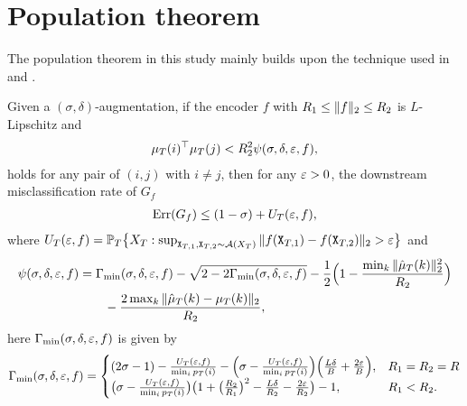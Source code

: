 \section{Population theorem}\label{section: Appendix A}
The population theorem in this study mainly builds upon the technique used in \citet{huang2023towards} and \citet{duan2024unsupervisedtransferlearningadversarial}.
\begin{lemma}
\label{lemma: sufficient condition of small Err}
Given a $(\sigma, \delta)$-augmentation, if the encoder $f$ with $R_1 \leq \Vert{f}\Vert_2 \leq R_2$ is $L$-Lipschitz and
\begin{align*}
\mu_T(i)^\top\mu_T(j) < R_2^2\psi(\sigma, \delta, \varepsilon, f),
\end{align*}
holds for any pair of $(i,j)$ with $i \neq j$, then for any $\varepsilon > 0$, the downstream misclassification rate of $G_f$
\begin{align*}
\text{\rm Err}(G_f) \leq (1 - \sigma) + U_T(\varepsilon, f),
\end{align*}
where $U_T(\varepsilon, f) = \mathbb{P}_T\big\{X_T: \sup_{\mathtt{X}_{T,1}, \mathtt{X}_{T,2} \sim \mathcal{A}(X_T)}\Vert{f(\mathtt{X}_{T,1}) - f(\mathtt{X}_{T,2})}\Vert_2 > \varepsilon\big\}$ and
\begin{align}\label{eq: Ψ(σ, δ, ε, f)}
    \psi(\sigma, \delta, \varepsilon,f) &= \Gamma_{\min}(\sigma, \delta, \varepsilon, f) - \sqrt{2 - 2\Gamma_{\min}(\sigma, \delta, \varepsilon, f)} - \frac{1}{2}\Big(1 - \frac{\min_k\Vert{\hat{\mu}_T(k)}\Vert_2^2}{R_2}\Big) \nonumber\\
    &\qquad - \frac{2\max_k\Vert{\hat{\mu}_T(k) - \mu_T(k)}\Vert_2}{R_2},
\end{align}
here $\Gamma_{\min}(\sigma, \delta, \varepsilon, f)$ is given by
\begin{align*}
    \Gamma_{\min}(\sigma, \delta, \varepsilon, f) = \begin{cases}
    (2\sigma - 1) - \frac{U_T(\varepsilon, f)}{\min_ip_T(i)} - \Big(\sigma - \frac{U_T(\varepsilon, f)}{\min_ip_T(i)}\Big)\Big(\frac{L\delta}{B} + \frac{2\varepsilon}{B}\Big), &R_1 = R_2 = R \\
    \big(\sigma - \frac{U_T(\varepsilon, f)}{\min_ip_T(i)}\big)\big(1 + \big(\frac{R_2}{R_1}\big)^2 - \frac{L\delta}{R_2} - \frac{2\varepsilon}{R_2}\big) - 1, & R_1 < R_2.
\end{cases}
\end{align*}
\end{lemma}

